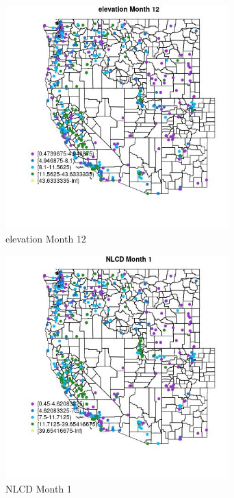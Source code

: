 \begin{figure} 
\centering  
\includegraphics[width=0.77\textwidth]{Code_Outputs/ML_input_report_ML_input_PM25_Step5_part_d_de_duplicated_aves_ML_input_MapObsMo12elevation.jpg} 
\caption{\label{fig:ML_input_report_ML_input_PM25_Step5_part_d_de_duplicated_aves_ML_inputMapObsMo12elevation}elevation Month 12} 
\end{figure} 
 

\begin{figure} 
\centering  
\includegraphics[width=0.77\textwidth]{Code_Outputs/ML_input_report_ML_input_PM25_Step5_part_d_de_duplicated_aves_ML_input_MapObsMo1NLCD.jpg} 
\caption{\label{fig:ML_input_report_ML_input_PM25_Step5_part_d_de_duplicated_aves_ML_inputMapObsMo1NLCD}NLCD Month 1} 
\end{figure} 
 

